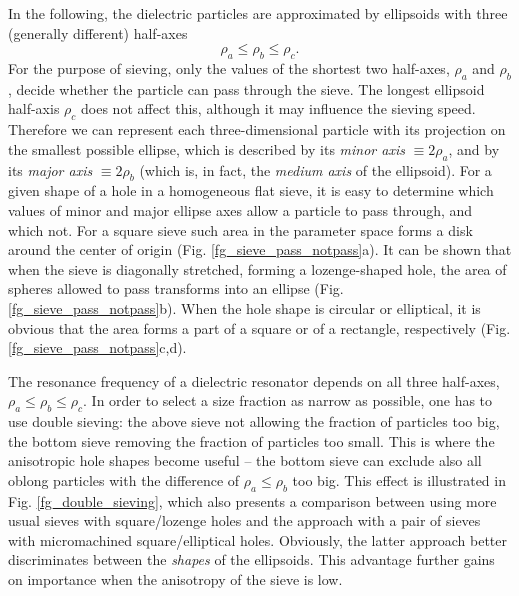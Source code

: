 In the following, the dielectric particles are approximated by ellipsoids with three (generally different) half-axes $$\rho_a \leq \rho_b \leq \rho_c.$$ For the purpose of sieving, only the values of the shortest two half-axes, $\rho_a$ and $\rho_b$, decide whether the particle can pass through the sieve. The longest ellipsoid half-axis $\rho_c$ does not affect this, although it may influence the sieving speed. Therefore we can represent each three-dimensional particle with its projection on the smallest possible ellipse, which is described by its \textit{minor axis} $\equiv 2\rho_a$, and by its \textit{major axis} $\equiv 2\rho_b$ (which is, in fact, the \textit{medium axis} of the ellipsoid). For a given shape of a hole in a homogeneous flat sieve, it is easy to determine which values of minor and major ellipse axes allow a particle to pass through, and which not. For a square sieve such area in the parameter space forms a disk around the center of origin (Fig. \ref{fg_sieve_pass_notpass}a). It can be shown that when the sieve is diagonally stretched, forming a lozenge-shaped hole, the area of spheres allowed to pass transforms into an ellipse (Fig. \ref{fg_sieve_pass_notpass}b). When the hole shape is circular or elliptical, it is obvious that the area forms a part of a square or of a rectangle, respectively  (Fig. \ref{fg_sieve_pass_notpass}c,d).

The resonance frequency of a dielectric resonator depends on all three half-axes, $\rho_a \leq \rho_b \leq \rho_c$. In order to select a size fraction as narrow as possible, one has to use double sieving: the above sieve not allowing the fraction of particles too big, the bottom sieve removing the fraction of particles too small. This is where the anisotropic hole shapes become useful -- the bottom sieve can exclude also all oblong particles with the difference of $\rho_a \leq \rho_b$ too big. This effect is illustrated in Fig. \ref{fg_double_sieving}, which also presents a comparison between using more usual sieves with square/lozenge holes and the approach with a pair of sieves with micromachined square/elliptical holes. Obviously, the latter approach better discriminates between the \textit{shapes} of the ellipsoids. This advantage further gains on importance when the anisotropy of the sieve is low.

